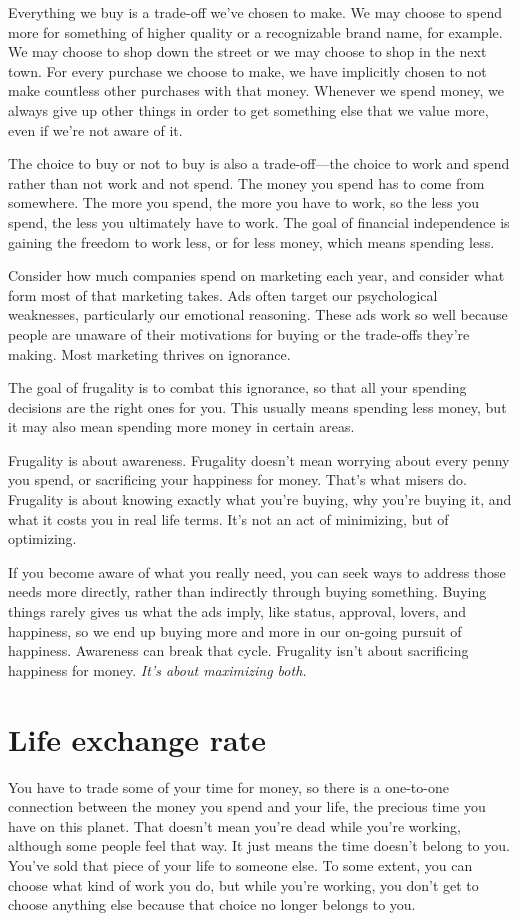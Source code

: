 Everything we buy is a trade-off we've chosen to make. We may choose to spend more for something of higher quality or a recognizable brand name, for example. We may choose to shop down the street or we may choose to shop in the next town. For every purchase we choose to make, we have implicitly chosen to not make countless other purchases with that money. Whenever we spend money, we always give up other things in order to get something else that we value more, even if we're not aware of it.

The choice to buy or not to buy is also a trade-off---the choice to work and spend rather than not work and not spend. The money you spend has to come from somewhere. The more you spend, the more you have to work, so the less you spend, the less you ultimately have to work. The goal of financial independence is gaining the freedom to work less, or for less money, which means spending less.

Consider how much companies spend on marketing each year, and consider what form most of that marketing takes. Ads often target our psychological weaknesses, particularly our emotional reasoning. These ads work so well because people are unaware of their motivations for buying or the trade-offs they're making. Most marketing thrives on ignorance.

The goal of frugality is to combat this ignorance, so that all your spending decisions are the right ones for you. This usually means spending less money, but it may also mean spending more money in certain areas.

Frugality is about awareness. Frugality doesn't mean worrying about every penny you spend, or sacrificing your happiness for money. That's what misers do. Frugality is about knowing exactly what you're buying, why you're buying it, and what it costs you in real life terms. It's not an act of minimizing, but of optimizing.

If you become aware of what you really need, you can seek ways to address those needs more directly, rather than indirectly through buying something. Buying things rarely gives us what the ads imply, like status, approval, lovers, and happiness, so we end up buying more and more in our on-going pursuit of happiness. Awareness can break that cycle. Frugality isn't about sacrificing happiness for money. \emph{It's about maximizing both.}

\section{Life exchange rate}
You have to trade some of your time for money, so there is a one-to-one connection between the money you spend and your life, the precious time you have on this planet. That doesn't mean you're dead while you're working, although some people feel that way. It just means the time doesn't belong to you. You've sold that piece of your life to someone else. To some extent, you can choose what kind of work you do, but while you're working, you don't get to choose anything else because that choice no longer belongs to you.

